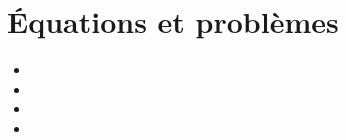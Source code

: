 \chapter{Équations et problèmes}\label{ChEquationEtPb}

\vspace{5cm}
\begin{acquis}
\begin{itemize}
\item 
\item
\item
\item
\end{itemize}
\end{acquis}


\activites  


\cours


\exercicesbase
\begin{colonne*exercice}

\end{colonne*exercice}


\exercicesappr
\begin{colonne*exercice}

\end{colonne*exercice}

\connaissances


\TravauxPratiques


\recreation %



